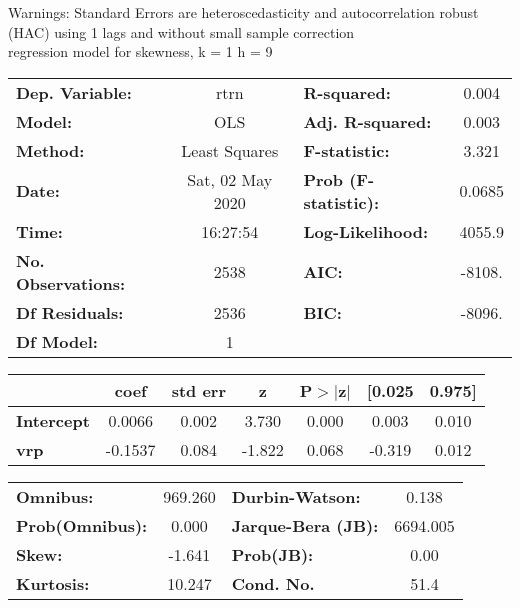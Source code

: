 Warnings: \newline
 [1] Standard Errors are heteroscedasticity and autocorrelation robust (HAC) using 1 lags and without small sample correction\\ 

regression model for skewness, k = 1 h = 9\begin{center}
\begin{tabular}{lclc}
\toprule
\textbf{Dep. Variable:}    &       rtrn       & \textbf{  R-squared:         } &     0.004   \\
\textbf{Model:}            &       OLS        & \textbf{  Adj. R-squared:    } &     0.003   \\
\textbf{Method:}           &  Least Squares   & \textbf{  F-statistic:       } &     3.321   \\
\textbf{Date:}             & Sat, 02 May 2020 & \textbf{  Prob (F-statistic):} &   0.0685    \\
\textbf{Time:}             &     16:27:54     & \textbf{  Log-Likelihood:    } &    4055.9   \\
\textbf{No. Observations:} &        2538      & \textbf{  AIC:               } &    -8108.   \\
\textbf{Df Residuals:}     &        2536      & \textbf{  BIC:               } &    -8096.   \\
\textbf{Df Model:}         &           1      & \textbf{                     } &             \\
\bottomrule
\end{tabular}
\begin{tabular}{lcccccc}
                   & \textbf{coef} & \textbf{std err} & \textbf{z} & \textbf{P$> |$z$|$} & \textbf{[0.025} & \textbf{0.975]}  \\
\midrule
\textbf{Intercept} &       0.0066  &        0.002     &     3.730  &         0.000        &        0.003    &        0.010     \\
\textbf{vrp}       &      -0.1537  &        0.084     &    -1.822  &         0.068        &       -0.319    &        0.012     \\
\bottomrule
\end{tabular}
\begin{tabular}{lclc}
\textbf{Omnibus:}       & 969.260 & \textbf{  Durbin-Watson:     } &    0.138  \\
\textbf{Prob(Omnibus):} &   0.000 & \textbf{  Jarque-Bera (JB):  } & 6694.005  \\
\textbf{Skew:}          &  -1.641 & \textbf{  Prob(JB):          } &     0.00  \\
\textbf{Kurtosis:}      &  10.247 & \textbf{  Cond. No.          } &     51.4  \\
\bottomrule
\end{tabular}
\end{center}

